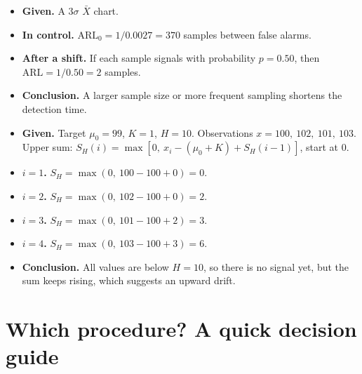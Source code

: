 \begin{example}
\begin{itemize}
  \item \textbf{Given.} A $3\sigma$ $\bar{X}$ chart.
  \item \textbf{In control.} $\mathrm{ARL}_0=1/0.0027=370$ samples between false alarms.
  \item \textbf{After a shift.} If each sample signals with probability $p=0.50$, then $\mathrm{ARL}=1/0.50=2$ samples.
  \item \textbf{Conclusion.} A larger sample size or more frequent sampling shortens the detection time.
\end{itemize}
\end{example}

\begin{example}
\begin{itemize}
  \item \textbf{Given.} Target $\mu_0=99$, $K=1$, $H=10$. Observations $x=100,\ 102,\ 101,\ 103$. Upper sum: $S_H(i)=\max[0,\ x_i-(\mu_0+K)+S_H(i-1)]$, start at $0$.
  \item \textbf{$i=1$.} $S_H=\max(0,\ 100-100+0)=0$.
  \item \textbf{$i=2$.} $S_H=\max(0,\ 102-100+0)=2$.
  \item \textbf{$i=3$.} $S_H=\max(0,\ 101-100+2)=3$.
  \item \textbf{$i=4$.} $S_H=\max(0,\ 103-100+3)=6$.
  \item \textbf{Conclusion.} All values are below $H=10$, so there is no signal yet, but the sum keeps rising, which suggests an upward drift.
\end{itemize}
\end{example}

\section{Which procedure? A quick decision guide}

